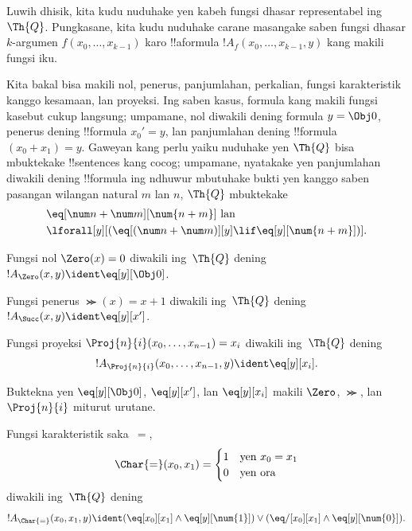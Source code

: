 \documentclass[../../../include/open-logic-section]{subfiles}
\begin{document}

Luwih dhisik, kita kudu nuduhake yen kabeh fungsi dhasar representabel
ing~$\Th{Q}$. Pungkasane, kita kudu nuduhake carane masangake saben
fungsi dhasar $k$-argumen $f(x_0,\dots,x_{k-1})$ karo !!a{formula}
$!A_f(x_0,\dots,x_{k-1},y)$ kang makili fungsi iku.

Kita bakal bisa makili nol, penerus, panjumlahan,
perkalian, fungsi karakteristik kanggo kesamaan, lan proyeksi. Ing
saben kasus, formula kang makili fungsi kasebut cukup
langsung; umpamane, nol diwakili dening formula $y = \Obj 0$,
penerus dening !!{formula} $x_0' = y$, lan panjumlahan dening
!!{formula} $(x_0 + x_1) = y$. Gaweyan kang perlu yaiku nuduhake yen
$\Th{Q}$ bisa mbuktekake !!{sentence}s kang cocog; umpamane, nyatakake
yen panjumlahan diwakili dening !!{formula} ing ndhuwur
mbutuhake bukti yen kanggo saben pasangan wilangan natural $m$ lan $n$,
$\Th{Q}$ mbuktekake
\begin{align*}
& \eq[\num n + \num m][\num {n+m}] \text{ lan}\\
& \lforall[y][(\eq[(\num n + \num m)][y] \lif \eq[y][\num{n+m}])].
\end{align*}

\begin{prop}
Fungsi nol $\Zero(x) = 0$ diwakili ing~$\Th{Q}$ dening
$!A_{\Zero}(x,y) \ident \eq[y][\Obj 0]$.
\end{prop}

\begin{prop}
Fungsi penerus $\Succ(x) = x+1$ diwakili ing~$\Th{Q}$ dening
$!A_{\Succ}(x,y) \ident \eq[y][x']$.  
\end{prop}

\begin{prop}
Fungsi proyeksi $\Proj{n}{i}(x_0, \dots, x_{n-1}) = x_i$
diwakili ing~$\Th{Q}$ dening \[!A_{\Proj{n}{i}}(x_0, \dots, x_{n-1}, y) \ident \eq[y][x_i].\]
\end{prop}

\begin{prob}
Buktekna yen $\eq[y][\Obj 0]$, $\eq[y][x']$, lan $\eq[y][x_i]$
makili $\Zero$, $\Succ$, lan $\Proj{n}{i}$ miturut urutane.
\end{prob}

\begin{prop}
Fungsi karakteristik saka~$=$,
\[
\Char{=}(x_0, x_1) =
\begin{cases}
  1 & \text{yen } x_0 =x_1\\
  0 & \text{yen ora}
\end{cases}
\]
diwakili ing~$\Th{Q}$ dening
\[
  !A_{\Char{=}}(x_0, x_1, y) \ident (\eq[x_0][x_1] \land \eq[y][\num{1}]) \lor (\eq/[x_0][x_1] \land
\eq[y][\num{0}]).
\]
\end{prop}
\end{document}
